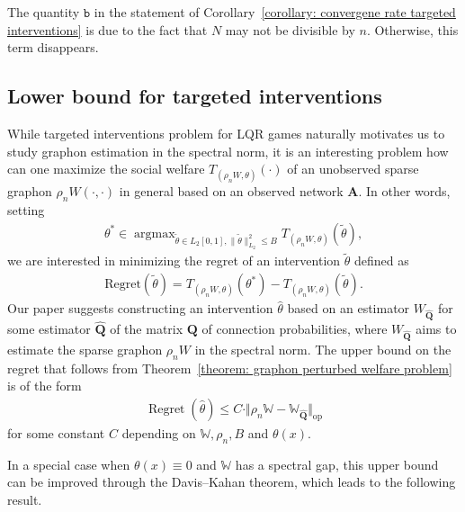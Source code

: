 \documentclass[11pt]{article}
\newcommand{\op}{\mathrm{op}}
\newcommand{\bA}{\bm{A}}
\newcommand{\bQ}{\bm{Q}}
\newcommand{\bbW}{\mathbb{W}}
\newcommand{\<}{\langle}
\renewcommand{\>}{\rangle}
\newcommand{\regret}{\operatorname{Regret}}
\newcommand{\ttb}{\mathtt{b}}
\DeclareMathOperator*{\argmax}{argmax}
\theoremstyle{plain}
\theoremstyle{definition}
\theoremstyle{remark}
\begin{document}
 The quantity $\ttb$ in the statement of Corollary~\ref{corollary: convergene rate targeted interventions} is due to the fact that $N$ may not be divisible by $n$. Otherwise, this term disappears. 

 {
 \subsection{Lower bound for targeted interventions}
 \label{section: regret lower bounds}

While targeted interventions problem for LQR games naturally motivates us to study graphon estimation in the spectral norm, it is an interesting problem how can one  maximize the social welfare $T_{(\rho_n W, \theta)}(\cdot)$ of an unobserved sparse graphon $\rho_n W(\cdot, \cdot)$ in general based on an observed network $\bA$. In other words, setting
\begin{align*}
    \theta^* \in \argmax_{\tilde{\theta} \in L_2[0,1], \|\tilde{\theta}\|_{L_2}^2 \le B} T_{(\rho_n W,\theta)}(\tilde{\theta}), 
\end{align*}
we are interested in minimizing the regret of an intervention $\tilde{\theta}$ defined as
\begin{align*}
    \mathrm{Regret}(\tilde{\theta}) = T_{(\rho_n W,\theta)}(\theta^*) - T_{(\rho_n W,\theta)}(\tilde{\theta}).
\end{align*}
Our paper suggests constructing an intervention $\widehat{\theta}$ based on an estimator $W_{\widehat{\bQ}}$ for some estimator $\widehat{\bQ}$ of the matrix $\bQ$ of connection probabilities, where $W_{\widehat{\bQ}}$ aims to estimate the sparse graphon $\rho_n W$ in the spectral norm. The upper bound on the regret that follows from Theorem~\ref{theorem: graphon perturbed welfare problem} is of the form
\begin{align*}
    \regret(\widehat{\theta}) \le C \cdot  \Vert \rho_n \bbW - \bbW_{\widehat{\bQ}} \Vert_{\op}
\end{align*}
for some constant $C$ depending on $\bbW, \rho_n, B$ and $\theta(x)$. 

In a special case when $\theta(x) \equiv 0$ and $\bbW$ has a spectral gap, this upper bound can be improved through the Davis--Kahan theorem, which leads to the following result.

}
\end{document}
